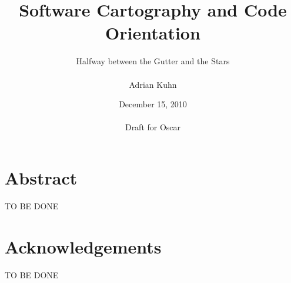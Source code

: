 \documentclass[10pt]{book}
\title{Software Cartography and Code Orientation}
\author{Halfway between the Gutter and the Stars\\~\\Adrian Kuhn}
\date{December 15, 2010\\~\\Draft for Oscar}
\begin{document}
\maketitle

\chapter*{Abstract}
TO BE DONE

\chapter*{Acknowledgements}
TO BE DONE

\setcounter{tocdepth}{1}
\tableofcontents






\end{document}
